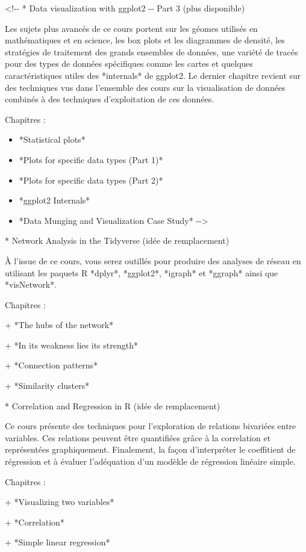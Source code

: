 \documentclass[
  letterpaper,
]{scrbook}
\begin{document}
\textless!-\/- * Data visualization with ggplot2 -\/- Part 3 (plus
disponible)

Les sujets plus avancés de ce cours portent sur les géomes utilisés en
mathématiques et en science, les box plots et les diagrammes de densité,
les stratégies de traitement des grands ensembles de données, une
variété de tracés pour des types de données spécifiques comme les cartes
et quelques caractéristiques utiles des *internals* de ggplot2. Le
dernier chapitre revient sur des techniques vus dans l'ensemble des
cours sur la visualisation de données combinés à des techniques
d'exploitation de ces données.

Chapitres :

\begin{itemize}
\item
  *Statistical plots*
\item
  *Plots for specific data types (Part 1)*
\item
  *Plots for specific data types (Part 2)*
\item
  *ggplot2 Internals*
\item
  *Data Munging and Visualization Case Study* -\/-\textgreater{}
\end{itemize}

* Network Analysis in the Tidyverse (idée de remplacement)

À l'issue de ce cours, vous serez outillés pour produire des analyses de
réseau en utilisant les paquets R *dplyr*, *ggplot2*, *igraph* et
*ggraph* ainsi que *visNetwork*.

Chapitres :

+ *The hubs of the network*

+ *In its weakness lies its strength*

+ *Connection patterns*

+ *Similarity clusters*

* Correlation and Regression in R (idée de remplacement)

Ce cours présente des techniques pour l'exploration de relations
bivariées entre variables. Ces relations peuvent être quantifiées grâce
à la correlation et représentées graphiquement. Finalement, la façon
d'interpréter le coeffitient de régression et à évaluer l'adéquation
d'un modèkle de régression linéaire simple.

Chapitres :

+ *Visualizing two variables*

+ *Correlation*

+ *Simple linear regression*
\end{document}
